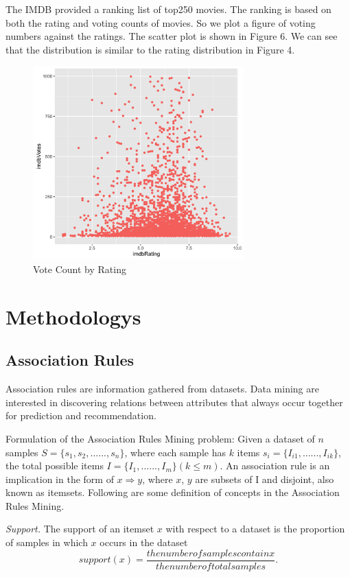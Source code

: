 \documentclass[conference]{IEEEtran}
\begin{document}
The IMDB provided a ranking list of top250 movies. The ranking is based on both the rating and voting counts of movies. So we plot a figure of voting numbers against the ratings. The scatter plot is shown in Figure 6. We can see that the distribution is similar to the rating distribution in Figure 4.
\begin{figure}
	\centering
	\includegraphics[width=3.2in]{vote.png}
	\caption{Vote Count by Rating}
	\label{fig:side:a}
\end{figure}

\section{Methodologys}
\subsection{Association Rules}

Association rules are information gathered from datasets. Data mining are interested in discovering relations between attributes that always occur together for prediction and recommendation. 

Formulation of the Association Rules Mining problem\cite{Michael}:
Given a dataset of $n$ samples $S = \{s_1, s_2, ......, s_n\}$, where each sample has $k$ items $s_i = \{I_{i1}, ......, I_{ik}\}$, the total possible items $I = \{I_1, ......, I_m\}(k\leq m)$.  An association rule is an implication in the form of $x\Rightarrow y$, where $x$, $y$ are subsets of I and disjoint, also known as itemsets. Following are some definition of concepts in the Association Rules Mining.

\textit{Support.} The support of an itemset $x$ with respect to a dataset is the proportion of samples in which $x$ occurs in the dataset
\begin{equation*}
support(x) = \frac{the number of samples contain x}{the number of total samples}.
\end{equation*}
  
\end{document}

